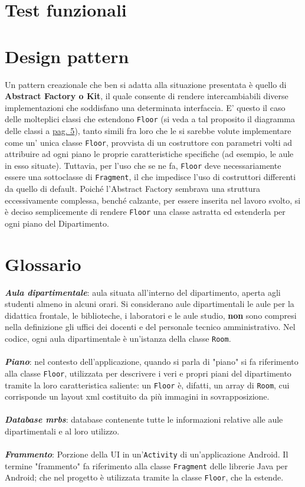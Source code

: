 \documentclass{article}
\def\code#1{\texttt{#1}}
\begin{document}
	\part{Test funzionali}
	\newpage
	\part{Design pattern} %
	Un pattern creazionale che ben si adatta alla situazione presentata è quello di \textbf{Abstract Factory o Kit}, il quale consente di rendere intercambiabili diverse implementazioni che soddisfano una determinata interfaccia. E' questo il caso delle molteplici classi che estendono \code{Floor} (si veda a tal proposito il diagramma delle classi a \hyperlink{page.5}{pag. 5}), tanto simili fra loro che le si sarebbe volute implementare come un' unica classe \code{Floor}, provvista di un costruttore con parametri volti ad attribuire ad ogni piano le proprie caratteristiche specifiche (ad esempio, le aule in esso situate). Tuttavia, per l'uso che se ne fa, \code{Floor} deve necessariamente essere una sottoclasse di \code{Fragment}, il che impedisce l'uso di costruttori differenti da quello di default. Poiché l'Abstract Factory sembrava una struttura eccessivamente complessa, benché calzante, per essere inserita nel lavoro svolto, si è deciso semplicemente di rendere \code{Floor} una classe astratta ed estenderla per ogni piano del Dipartimento.
	\newpage
	\appendix
	\part{Glossario}
	\textit{\textbf{Aula dipartimentale}}: aula situata all'interno del dipartimento, aperta agli studenti almeno in alcuni orari. Si considerano aule dipartimentali le aule per la didattica frontale, le biblioteche, i laboratori e le aule studio, \textbf{non} sono compresi nella definizione gli uffici dei docenti e del personale tecnico amministrativo. Nel codice, ogni aula dipartimentale è un'istanza della classe \code{Room}.\\\\
	\textit{\textbf{Piano}}: nel contesto dell'applicazione, quando si parla di "piano" si fa riferimento alla classe \code{Floor}, utilizzata per descrivere i veri e propri piani del dipartimento tramite la loro caratteristica saliente: un \code{Floor} è, difatti, un array di \code{Room}, cui corrisponde un layout xml costituito da più immagini in sovrapposizione.\\\\
	\textit{\textbf{Database mrbs}}: database contenente tutte le informazioni relative alle aule dipartimentali e al loro utilizzo.\\\\
	\textit{\textbf{Frammento}}: Porzione della UI in un'\code{Activity} di un'applicazione Android. Il termine "frammento" fa riferimento alla classe \code{Fragment} delle librerie Java per Android; che nel progetto è utilizzata tramite la classe \code{Floor}, che la estende.\\\\
\end{document}
